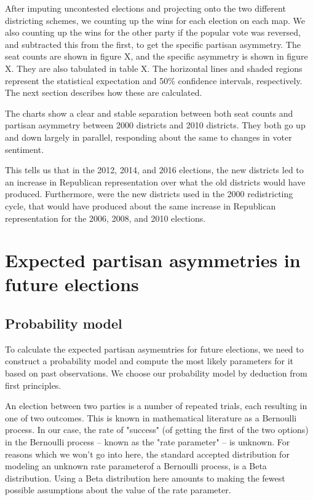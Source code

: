 \documentclass[preprint,12pt]{article}
\begin{document}
After imputing uncontested elections and projecting onto the two different districting schemes, we counting up the wins for each election on each map.
We also counting up the wins for the other party if the popular vote was reversed, and subtracted this from the first, to get the specific partisan asymmetry.
The seat counts are shown in figure X, and the specific asymmetry is shown in figure X.  They are also tabulated in table X.
The horizontal lines and shaded regions represent the statistical expectation and 50\% confidence intervals, respectively.
The next section describes how these are calculated.

The charts show a clear and stable separation between both seat counts and partisan asymmetry between 2000 districts and 2010 districts.
They both go up and down largely in parallel, responding about the same to changes in voter sentiment.

This tells us that in the 2012, 2014, and 2016 elections, the new districts led to an increase in Republican representation over what the old districts would have produced.
Furthermore, were the new districts used in the 2000 redistricting cycle, that would have produced about the same increase in Republican representation for the 2006, 2008, and 2010 elections.

\section{Expected  partisan asymmetries in future elections}

\subsection{Probability model}

To calculate the expected partisan asymemtries for future elections, we need to construct a probability model and compute the most likely parameters for it based on past observations.
We choose our probability model by deduction from first principles.

An election between two parties is a number of repeated trials, each resulting in one of two outcomes.  This is known in mathematical literature as a Bernoulli process.
In our case, the rate of "success" (of getting the first of the two options) in the Bernoulli process -- known as the "rate parameter" -- is unknown.
For reasons which we won't go into here, the standard accepted distribution for modeling an unknown rate parameterof a Bernoulli process, is a Beta distribution.
Using a Beta distribution here amounts to making the fewest possible assumptions about the value of the rate parameter.
\end{document}
